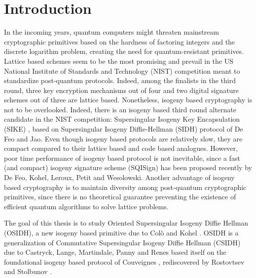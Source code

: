 \documentclass[a4paper,10pt]{report}
\theoremstyle{definition}
\theoremstyle{plain}
\theoremstyle{definition}
\renewcommand{\(}{\left(}
\renewcommand{\)}{\right)}
\begin{document}
\chapter*{Introduction}

In the incoming years, quantum computers might threaten mainstream cryptographic primitives based on the hardness of factoring integers and the discrete logarithm problem, creating the need for quantum-resistant primitives. Lattice based schemes seem to be the most promising and prevail in the US National Institute of Standards and Technology (NIST) competition meant to standardize post-quantum protocols. Indeed, among the finalists in the third round, three key encryption mechanisms out of four and two digital signature schemes out of three are lattice based. Nonetheless, isogeny based cryptography is not to be overlooked. Indeed, there is an isogeny based third round alternate candidate in the NIST competition: Supersingular Isogeny Key Encapsulation (SIKE) \cite{SIKE}, based on Supersingular Isogeny Diffie-Hellman (SIDH) protocol \cite{DeFeoSIDH} of De Feo and Jao.  Even though isogeny based protocols are relatively slow, they are compact compared to their lattice based and code based analogues. However, poor time performance of isogeny based protocol is not inevitable, since a fast (and compact) isogeny signature scheme (SQISign) \cite{SQISign} has been proposed recently by De Feo, Kohel, Leroux, Petit and Wesolowski. Another advantage of isogeny based cryptography is to maintain diversity among post-quantum cryptographic primitives, since there is no theoretical guarantee preventing the existence of efficient quantum algorithms to solve lattice problems.

The goal of this thesis is to study Oriented Supersingular Isogeny Diffie Hellman (OSIDH), a new isogeny based primitive due to Col\`{o} and Kohel \cite{OSIDH}. OSIDH is a generalization of Commutative Supersingular Isogeny Diffie Hellman (CSIDH) \cite{CSIDH} due to Castryck, Lange, Martindale, Panny and Renes based itself on the foundational isogeny based protocol of Couveignes \cite{Couveignes}, rediscovered by Rostovtsev and Stolbunov \cite{RosSto}. 
\end{document}
